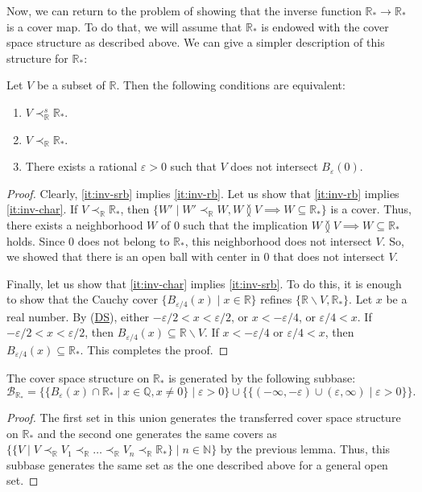 \documentclass[reqno]{amsart}
\newcommand{\axref}[1]{(\hyperref[ax:#1]{#1})}
\theoremstyle{definition}
\theoremstyle{remark}
\numberwithin{figure}{section}
\newcommand{\overlap}[2]{#1 \between #2}
\newcommand{\rb}{\prec}
\begin{document}
Now, we can return to the problem of showing that the inverse function $\mathbb{R}_* \to \mathbb{R}_*$ is a cover map.
To do that, we will assume that $\mathbb{R}_*$ is endowed with the cover space structure as described above.
We can give a simpler description of this structure for $\mathbb{R}_*$:

\begin{lem}
Let $V$ be a subset of $\mathbb{R}$.
Then the following conditions are equivalent:
\begin{enumerate}
\item \label{it:inv-srb} $V \rb^s_\mathbb{R} \mathbb{R}_*$.
\item \label{it:inv-rb} $V \rb_\mathbb{R} \mathbb{R}_*$.
\item \label{it:inv-char} There exists a rational $\varepsilon > 0$ such that $V$ does not intersect $B_\varepsilon(0)$.
\end{enumerate}
\end{lem}
\begin{proof}
Clearly, \eqref{it:inv-srb} implies \eqref{it:inv-rb}.
Let us show that \eqref{it:inv-rb} implies \eqref{it:inv-char}.
If $V \rb_\mathbb{R} \mathbb{R}_*$, then $\{ W' \mid W' \rb_\mathbb{R} W, \overlap{W}{V} \implies W \subseteq \mathbb{R}_* \}$ is a cover.
Thus, there exists a neighborhood $W$ of $0$ such that the implication $\overlap{W}{V} \implies W \subseteq \mathbb{R}_*$ holds.
Since $0$ does not belong to $\mathbb{R}_*$, this neighborhood does not intersect $V$.
So, we showed that there is an open ball with center in $0$ that does not intersect $V$.

Finally, let us show that \eqref{it:inv-char} implies \eqref{it:inv-srb}.
To do this, it is enough to show that the Cauchy cover $\{ B_{\varepsilon/4}(x) \mid x \in \mathbb{R} \}$ refines $\{ \mathbb{R} \backslash V, \mathbb{R}_* \}$.
Let $x$ be a real number.
By \axref{DS}, either $-\varepsilon/2 < x < \varepsilon/2$, or $x < -\varepsilon/4$, or $\varepsilon/4 < x$.
If $-\varepsilon/2 < x < \varepsilon/2$, then $B_{\varepsilon/4}(x) \subseteq \mathbb{R} \backslash V$.
If $x < -\varepsilon/4$ or $\varepsilon/4 < x$, then $B_{\varepsilon/4}(x) \subseteq \mathbb{R}_*$.
This completes the proof.
\end{proof}

\begin{prop}
The cover space structure on $\mathbb{R}_*$ is generated by the following subbase:
\[ \mathcal{B}_{\mathbb{R}_*} = \{ \{ B_\varepsilon(x) \cap \mathbb{R}_* \mid x \in \mathbb{Q}, x \neq 0 \} \mid \varepsilon > 0 \} \cup \{ \{ (- \infty, - \varepsilon) \cup (\varepsilon, \infty) \mid \varepsilon > 0 \} \}. \]
\end{prop}
\begin{proof}
The first set in this union generates the transferred cover space structure on $\mathbb{R}_*$ and the second one generates the same covers as $\{ \{ V \mid V \rb_\mathbb{R} V_1 \rb_\mathbb{R} \ldots \rb_\mathbb{R} V_n \rb_\mathbb{R} \mathbb{R}_* \} \mid n \in \mathbb{N} \}$ by the previous lemma.
Thus, this subbase generates the same set as the one described above for a general open set.
\end{proof}
\end{document}
